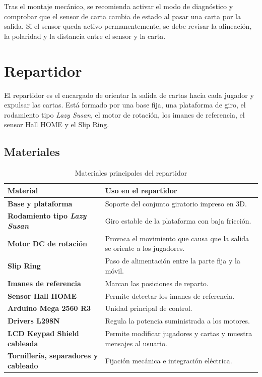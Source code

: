 \documentclass[a4paper, 11pt]{article}
\begin{document}
Tras el montaje mecánico, se recomienda activar el modo de diagnóstico y comprobar que el sensor de carta cambia de estado al pasar una carta por la salida. Si el sensor queda activo permanentemente, se debe revisar la alineación, la polaridad y la distancia entre el sensor y la carta.

\section{Repartidor}

El repartidor es el encargado de orientar la salida de cartas hacia cada jugador y expulsar las cartas. Está formado por una base fija, una plataforma de giro, el rodamiento tipo \textit{Lazy Susan}, el motor de rotación, los imanes de referencia, el sensor Hall HOME y el Slip Ring.

\subsection{Materiales}

\begin{table}[H]
\centering
\small
\begin{tabularx}{\textwidth}{>{\bfseries}p{}X}
\hline
\textbf{Material} & \textbf{Uso en el repartidor} \\
\hline
Base y plataforma & Soporte del conjunto giratorio impreso en 3D. \\
Rodamiento tipo \textit{Lazy Susan} & Giro estable de la plataforma con baja fricción. \\
Motor DC de rotación & Provoca el movimiento que causa que la salida se oriente a los jugadores. \\
Slip Ring & Paso de alimentación entre la parte fija y la móvil. \\
Imanes de referencia & Marcan las posiciones de reparto. \\
Sensor Hall HOME & Permite detectar los imanes de referencia. \\
Arduino Mega 2560 R3 & Unidad principal de control. \\
Drivers L298N & Regula la potencia suministrada a los motores. \\
LCD Keypad Shield cableada & Permite modificar jugadores y cartas y muestra mensajes al usuario. \\
Tornillería, separadores y cableado & Fijación mecánica e integración eléctrica. \\
\hline
\end{tabularx}
\caption{Materiales principales del repartidor}
\label{tab:manual_repartidor_materiales}
\end{table}
\end{document}
